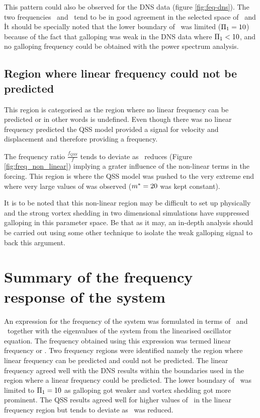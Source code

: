 
 
 This pattern could also be observed for the DNS data (figure \ref{fig:feq-dns}). The two frequencies \freqlin\ and \freqdns\ tend to be in good agreement in the selected space of \massstiff\ and \massdamp\. It should be specially noted that the lower boundary of \massstiff\ was limited ($\Pi_1=10$) because of the fact that galloping was weak in the DNS data where $\Pi_1<10$, and no galloping frequency could be obtained with the power spectrum analysis. 


\subsection{Region where linear frequency could not be predicted}

This region is categorised as the region where no linear frequency can be predicted or in other words \freqlin is undefined. Even though there was no linear frequency predicted the QSS model provided a signal for velocity and displacement and therefore providing a frequency. 



The frequency ratio $\frac{f_{QSS}}{f}$ tends to deviate as \massstiff\ reduces (Figure \ref{fig:freq_non_linear}) implying a grater influence of the non-linear terms in the forcing. This region is where the QSS model was pushed to the very extreme end where very large values of \ustar was observed ($m^{*}=20$ was kept constant). 

It is to be noted that this non-linear region may be difficult to set up physically and the strong vortex shedding in two dimensional simulations have suppressed galloping in this parameter space. Be that as it may, an in-depth analysis should be carried out using some other technique to isolate the weak galloping signal to back this argument. 

\section{Summary of the frequency response of the system}

An expression for the frequency of the system was formulated in terms of \massstiff\ and \massdamp\ together with the eigenvalues of the system from the linearised oscillator equation. The frequency obtained using this expression was termed linear frequency or \freqlin. Two frequency regions were identified namely the region where linear frequency can be predicted and could not be predicted. The linear frequency agreed well with the DNS results within the boundaries used in the region where a linear frequency could be predicted. The lower boundary of \massstiff\ was limited to $\Pi_1=10$ as galloping got weaker and vortex shedding got more prominent. The QSS results agreed well for higher values of \massstiff\ in the linear frequency region but tends to deviate as \massstiff\ was reduced. 

